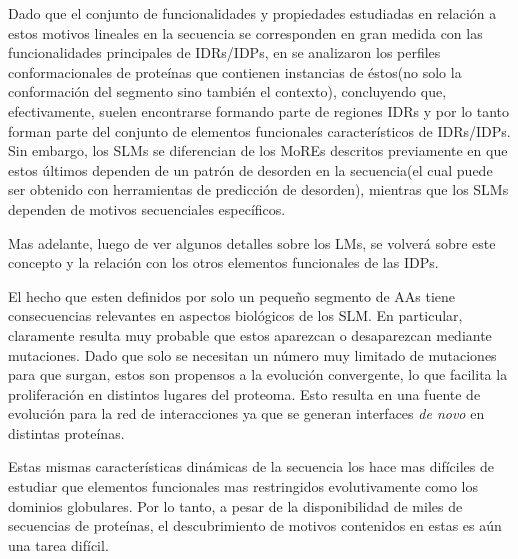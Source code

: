 Dado que el conjunto de funcionalidades y propiedades estudiadas en relación a estos motivos lineales en la secuencia se corresponden en gran medida con las funcionalidades principales de IDRs/IDPs, en \cite{fuxreiter2007local} se
analizaron los perfiles conformacionales de proteínas que contienen instancias de éstos(no solo la conformación del segmento sino también el contexto), concluyendo que, efectivamente, 
suelen encontrarse formando parte de regiones IDRs y por lo tanto forman parte del conjunto de elementos funcionales característicos de IDRs/IDPs.
Sin embargo, los SLMs se diferencian de los MoREs descritos previamente en que estos últimos dependen de un patrón de desorden en la secuencia(el cual puede ser obtenido con herramientas de predicción de desorden), 
mientras que los SLMs dependen de motivos secuenciales específicos.

Mas adelante, luego de ver algunos detalles sobre los LMs, se volverá sobre este concepto y la relación con los otros elementos funcionales de las IDPs.


El hecho que esten definidos por solo un pequeño segmento de AAs tiene consecuencias relevantes en aspectos biológicos de los SLM.
En particular, claramente resulta muy probable que estos aparezcan o desaparezcan mediante mutaciones. 
Dado que solo se necesitan un número muy limitado de mutaciones para que surgan, estos son propensos a la evolución convergente, lo que facilita la proliferación en distintos lugares del proteoma.
Esto resulta en una fuente de evolución para la red de interacciones ya que se generan interfaces \textit{de novo} en distintas proteínas.

Estas mismas características dinámicas de la secuencia los hace mas difíciles de estudiar que elementos funcionales mas restringidos evolutivamente como los dominios globulares.
Por lo tanto, a pesar de la disponibilidad de miles de secuencias de proteínas, el descubrimiento de motivos contenidos en estas es aún una tarea difícil.

